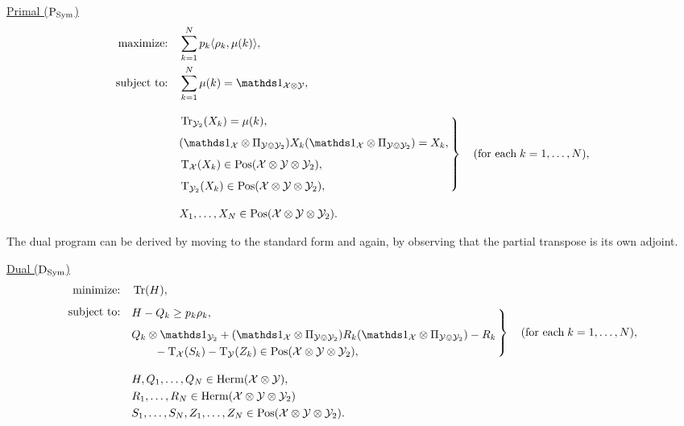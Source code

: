\begin{center}
\underline{Primal ($\textup{P}_{\mathrm{Sym}}$)}
\begin{equation}
  \label{eq:sym-primal-problem}
  \begin{split}
    \text{maximize:} \quad & 
      \sum_{k=1}^{N} p_{k}\ip{\rho_{k}}{\mu(k)},\\
    \text{subject to:} \quad & 
      \sum_{k=1}^{N} \mu(k) = \I_{\X\otimes\Y},\\[2ex]
        & \left.\kern-\nulldelimiterspace
        \!\!\begin{aligned}
          &\tr_{\Y_{2}}(X_{k}) = \mu(k),\\[1ex]
          &(\I_{\X}\otimes \Pi_{\Y\ovee\Y_{2}})X_{k}
                  (\I_{\X}\otimes \Pi_{\Y\ovee\Y_{2}}) = X_{k},\\[1ex]
          &\pt_{\X}(X_{k}) \in \Pos(\X\otimes\Y\otimes\Y_{2}),\\[1ex]
          &\pt_{\Y_{2}}(X_{k}) \in \Pos(\X\otimes\Y\otimes\Y_{2}),
      \end{aligned}\,\right\} \quad(\text{for each}\;k = 1,\ldots,N),\\[2ex]
      \quad & X_{1}, \ldots, X_{N} \in \Pos(\X\otimes\Y\otimes\Y_{2}).
  \end{split}
\end{equation}
\end{center}
\vspace{10pt} 
The dual program can be derived by moving to the standard form and again, 
by observing that the partial transpose is its own adjoint.
\vspace{10pt} 
\begin{center}
\underline{Dual ($\textup{D}_{\mathrm{Sym}}$)}
\begin{equation}
  \label{eq:sym-dual-problem}
  \begin{split}
    \text{minimize:} \quad &
      \tr(H),\\[1ex]
    \text{subject to:} 
      \quad \\[-3.5ex] 
      & \left.\kern-\nulldelimiterspace
        \!\!\begin{aligned}
          &H - Q_{k} \geq p_{k}\rho_{k},\\[1ex]
          & Q_{k}\otimes\I_{\Y_{2}} + (\I_{\X}\otimes \Pi_{\Y\ovee\Y_{2}})R_{k}(\I_{\X}\otimes \Pi_{\Y\ovee\Y_{2}}) - R_{k} \\ 
            & \qquad - \pt_{\X}(S_{k}) - \pt_{\Y}(Z_{k})
      \in \Pos(\X\otimes\Y\otimes\Y_{2}),
      \end{aligned}\,\right\} \quad(\text{for each}\;k = 1,\ldots,N),\\[2ex]
      \quad & H, Q_{1}, \ldots, Q_{N}\in\Herm(\X\otimes\Y),\\
      \quad & R_{1}, \ldots, R_{N}\in\Herm(\X\otimes\Y\otimes\Y_{2})\\
      \quad & S_{1}, \ldots, S_{N},Z_{1},\ldots,Z_{N}
        \in\Pos(\X\otimes\Y\otimes\Y_{2}).\\
  \end{split}
\end{equation}
\end{center}

